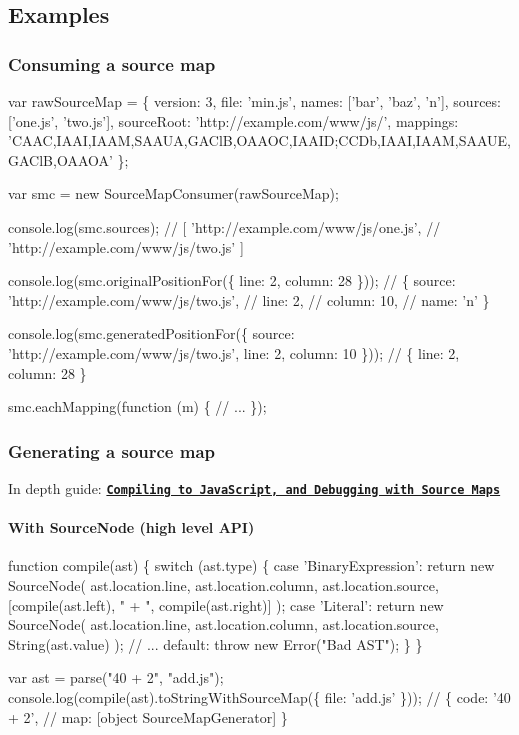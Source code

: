 \subsection*{Examples}

\subsubsection*{Consuming a source map}


\begin{DoxyCode}
var rawSourceMap = \{
  version: 3,
  file: 'min.js',
  names: ['bar', 'baz', 'n'],
  sources: ['one.js', 'two.js'],
  sourceRoot: 'http://example.com/www/js/',
  mappings: 'CAAC,IAAI,IAAM,SAAUA,GAClB,OAAOC,IAAID;CCDb,IAAI,IAAM,SAAUE,GAClB,OAAOA'
\};

var smc = new SourceMapConsumer(rawSourceMap);

console.log(smc.sources);
// [ 'http://example.com/www/js/one.js',
//   'http://example.com/www/js/two.js' ]

console.log(smc.originalPositionFor(\{
  line: 2,
  column: 28
\}));
// \{ source: 'http://example.com/www/js/two.js',
//   line: 2,
//   column: 10,
//   name: 'n' \}

console.log(smc.generatedPositionFor(\{
  source: 'http://example.com/www/js/two.js',
  line: 2,
  column: 10
\}));
// \{ line: 2, column: 28 \}

smc.eachMapping(function (m) \{
  // ...
\});
\end{DoxyCode}


\subsubsection*{Generating a source map}

In depth guide\+: \href{https://hacks.mozilla.org/2013/05/compiling-to-javascript-and-debugging-with-source-maps/}{\tt {\bfseries Compiling to Java\+Script, and Debugging with Source Maps}}

\paragraph*{With Source\+Node (high level A\+PI)}


\begin{DoxyCode}
function compile(ast) \{
  switch (ast.type) \{
  case 'BinaryExpression':
    return new SourceNode(
      ast.location.line,
      ast.location.column,
      ast.location.source,
      [compile(ast.left), " + ", compile(ast.right)]
    );
  case 'Literal':
    return new SourceNode(
      ast.location.line,
      ast.location.column,
      ast.location.source,
      String(ast.value)
    );
  // ...
  default:
    throw new Error("Bad AST");
  \}
\}

var ast = parse("40 + 2", "add.js");
console.log(compile(ast).toStringWithSourceMap(\{
  file: 'add.js'
\}));
// \{ code: '40 + 2',
//   map: [object SourceMapGenerator] \}
\end{DoxyCode}


